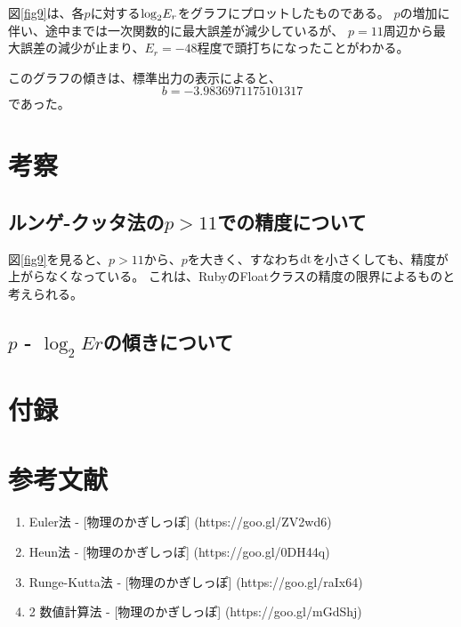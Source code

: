 \documentclass[11pt]{jsarticle}
\newcommand{\fr}[1]{図\ref{#1}}
\newcommand{\dtn}{{\rm dt}}
\begin{document}
            \fr{fig9}は、各$p$に対する${\rm log}_2E_r$をグラフにプロットしたものである。
            $p$の増加に伴い、途中までは一次関数的に最大誤差が減少しているが、
            $p = 11$周辺から最大誤差の減少が止まり、$E_r = -48$程度で頭打ちになったことがわかる。

            このグラフの傾きは、標準出力の表示によると、
            \[
                b = -3.9836971175101317
            \]
            であった。

    \section{考察}

        \subsection{ルンゲ-クッタ法の$p > 11$での精度について}
            \fr{fig9}を見ると、$p > 11$から、$p$を大きく、すなわち$\dtn$を小さくしても、精度が上がらなくなっている。
            これは、RubyのFloatクラスの精度の限界によるものと考えられる。
        \subsection{$p$ - $\log_2 Er$の傾きについて}

    \section{付録}

    \section{参考文献}
        \begin{enumerate}
            \item Euler法 - [物理のかぎしっぽ] (https://goo.gl/ZV2wd6)
            \item Heun法 - [物理のかぎしっぽ] (https://goo.gl/0DH44q)
            \item Runge-Kutta法 - [物理のかぎしっぽ] (https://goo.gl/raIx64)
            \item 2 数値計算法 - [物理のかぎしっぽ] (https://goo.gl/mGdShj)
        \end{enumerate}
\end{document}
